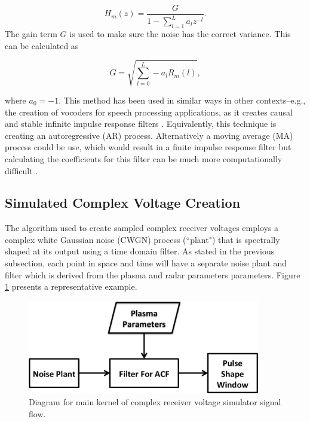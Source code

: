 \begin{equation}
\label{eq:filtz}
H_m(z) = \frac{G}{1-\displaystyle \sum_{l=1}^{L} a_l z^{-l}}.
\end{equation}
\noindent The gain term $G$ is used to make sure the noise has the correct variance. This can be calculated as 

\begin{equation}
\label{eq:gainterm}
G=\sqrt{\displaystyle \sum_{l=0}^L -a_l R_m(l)},
\end{equation}

\noindent where $a_0=-1$. This method has been used in similar ways in other contexts--e.g., the creation of vocoders for speech processing applications, as it creates causal and stable infinite impulse response filters \citep{rabinerdigitalspeech}. Equivalently, this technique is creating an autoregressive (AR) process. Alternatively a moving average (MA) process could be use, which would result in a finite impulse response filter but calculating the coefficients for this filter can be much more computationally difficult \citep{kayvol1} .

\subsection{Simulated Complex Voltage Creation}

The algorithm used to create sampled complex receiver voltages employs a complex white Gaussian noise (CWGN) process (``plant") that is spectrally shaped at its output using a time domain filter. As stated in the previous subsection, each point in space and time will have a separate noise plant and filter which is derived from the plasma and radar parameters parameters. Figure \ref{fig:IQdiagram} presents a representative example. 

\begin{figure}[h!]
\centering
\includegraphics[width=4in]{diagrampart}
\caption{Diagram for main kernel of complex receiver voltage simulator signal flow.}
\label{fig:IQdiagram}
\end{figure}

